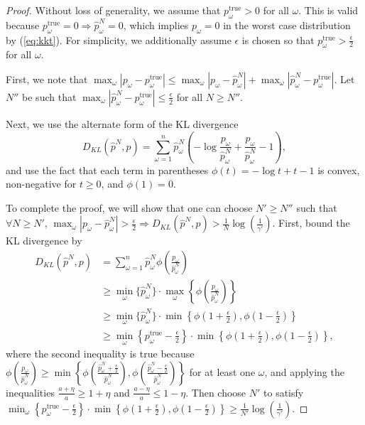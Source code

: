 \documentclass[11pt]{article}
\newcommand{\ptrue}{p^{\text{true}}}
\begin{document}
\begin{proof}
	Without loss of generality, we assume that $\ptrue_\omega > 0$ for all $\omega$.
	This is valid because $\ptrue_\omega = 0 \Rightarrow \hat{p}^N_\omega = 0$, which implies $p_\omega = 0$ in the worst case distribution by (\ref{eq:kkt}).
	For simplicity, we additionally assume $\epsilon$ is chosen so that $\ptrue_\omega > \frac{\epsilon}{2}$ for all $\omega$.
	
	First, we note that $\max_\omega |p_\omega - \ptrue_\omega| \leq \max_\omega |p_\omega - \hat{p}^N_\omega| + \max_\omega |\hat{p}^N_\omega - \ptrue_\omega|$.
	Let $N''$ be such that $\max_\omega |\hat{p}^N_\omega - \ptrue_\omega| \leq \frac{\epsilon}{2}$ for all $N \geq N''$.
	
	Next, we use the alternate form of the KL divergence
	\[
		D_{KL}(\hat{p}^N,p) = \sum_{\omega=1}^n \hat{p}^N_\omega \left( - \log \frac{p_\omega}{\hat{p}^N_\omega} + \frac{p_\omega}{\hat{p}^N_\omega} - 1 \right),
	\]
	and use the fact that each term in parentheses $\phi(t) = -\log t + t - 1$ is convex, non-negative for $t \geq 0$, and $\phi(1) = 0$.
	
	To complete the proof, we will show that one can choose $N' \geq N''$ such that $\forall N \geq N'$, $\max_\omega |p_\omega - \hat{p}^N_\omega| > \frac{\epsilon}{2} \Rightarrow D_{KL}(\hat{p}^N,p) > \frac{1}{N} \log\left(\frac{1}{\gamma'}\right)$.
	First, bound the KL divergence by
	\begin{align*}
		D_{KL}(\hat{p}^N,p) & = \sum_{\omega=1}^n \hat{p}^N_\omega \phi\left( \frac{p_\omega}{\hat{p}^N_\omega} \right) \\
		& \geq \min_\omega \{\hat{p}^N_\omega\} \cdot \max_\omega \left\{ \phi \left( \frac{p_\omega}{\hat{p}^N_\omega} \right) \right\} \\
		& \geq \min_\omega \{\hat{p}^N_\omega\} \cdot \min\left\{ \phi\left(1+\frac{\epsilon}{2}\right), \phi\left(1-\frac{\epsilon}{2}\right) \right\} \\
		& \geq \min_\omega \left\{ \ptrue_\omega - \frac{\epsilon}{2} \right\} \cdot \min\left\{ \phi\left(1+\frac{\epsilon}{2}\right), \phi\left(1-\frac{\epsilon}{2}\right) \right\},
	\end{align*}
	where the second inequality is true because $\phi \left( \frac{p_\omega}{\hat{p}^N_\omega} \right) \geq \min\left\{ \phi\left( \frac{\hat{p}^N_\omega+\tfrac{\epsilon}{2}}{\hat{p}^N_\omega} \right), \phi\left( \frac{\hat{p}^N_\omega-\tfrac{\epsilon}{2}}{\hat{p}^N_\omega} \right) \right\}$ for at least one $\omega$, and applying the inequalities $\frac{a+\eta}{a} \geq 1 + \eta$ and $\frac{a-\eta}{a} \leq 1-\eta$.
	Then choose $N'$ to satisfy $\min_\omega \left\{ \ptrue_\omega - \frac{\epsilon}{2} \right\} \cdot \min\left\{ \phi\left(1+\frac{\epsilon}{2}\right), \phi\left(1-\frac{\epsilon}{2}\right) \right\} \geq \frac{1}{N'} \log\left(\frac{1}{\gamma'}\right)$.
\end{proof}
\end{document}
